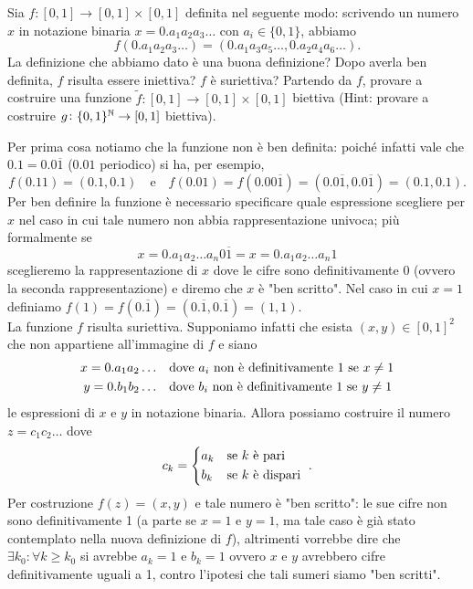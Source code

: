 \documentclass[a4paper]{article}\par \usepackage{style}\par
\begin{document}
\begin{es}
  Sia $ f \colon [0, 1] \to [0, 1] \times [0, 1] $ definita nel seguente modo: scrivendo un numero $ x $ in notazione binaria $ x = 0.a_1 a_2 a_3 \dots $ con $ a_i \in \{0, 1\} $, abbiamo \[f(0.a_1 a_2 a_3 \dots) = (0.a_1 a_3 a_5 \dots, 0.a_2 a_4 a_6 \dots).\] La definizione che abbiamo dato è una buona definizione? Dopo averla ben definita, $ f $ risulta essere iniettiva? $ f $ è suriettiva? Partendo da $ f $, provare a costruire una funzione $ \tilde f \colon [0, 1] \to [0, 1] \times [0, 1] $ biettiva ({Hint}: provare a costruire $ g \colon \{0, 1\}^{\mathbb{N}} \to [0, 1] $ biettiva).
\end{es}\par Per prima cosa notiamo che la funzione non è ben definita: poiché infatti vale che $ 0.1 = 0.0\overline{1} $ ($ 0.01 $ periodico) si ha, per esempio, \[f(0.11) = (0.1, 0.1) \quad \mathrm{e} \quad f(0.01) = f(0.00\overline{1}) = (0.0\overline{1}, 0.0\overline{1}) = (0.1, 0.1).\] Per ben definire la funzione è necessario specificare quale espressione scegliere per $ x $ nel caso in cui tale numero non abbia rappresentazione univoca; più formalmente se \[x = 0.a_1 a_2 \dots a_n 0\overline{1} = x = 0.a_1 a_2 \dots a_n 1\] sceglieremo la rappresentazione di $ x $ dove le cifre sono definitivamente 0 (ovvero la seconda rappresentazione) e diremo che $ x $ è "ben scritto". Nel caso in cui $ x = 1 $ definiamo $ f(1) = f(0.\overline{1}) = (0.\overline{1}, 0.\overline{1}) = (1, 1) $. \\
La funzione $ f $ risulta suriettiva. Supponiamo infatti che esista $ (x, y) \in [0, 1]^2 $ che non appartiene all'immagine di $ f $ e siano
\begin{align*}
  x = 0.a_1 a_2 \dots & \quad \text{dove $ a_i $ non è definitivamente 1 se $ x \neq 1 $} \\
  y = 0.b_1 b_2 \dots & \quad \text{dove $b_i $ non è definitivamente 1 se $ y \neq 1 $}
\end{align*}
le espressioni di $ x $ e $ y $ in notazione binaria. Allora possiamo costruire il numero $ z = c_1 c_2 \dots $ dove
\[c_k =
  \begin{cases*}
    a_k & \text{se $ k $ è pari} \\
    b_k & \text{se $ k $ è dispari}
  \end{cases*}.\]
Per costruzione $ f(z) = (x, y) $ e tale numero è "ben scritto": le sue cifre non sono definitivamente 1 (a parte se $ x = 1 $ e $ y = 1 $, ma tale caso è già stato contemplato nella nuova definizione di $ f $), altrimenti vorrebbe dire che $ \exists k_0 : \forall k \geq k_0 $  si avrebbe $ a_k = 1 $ e $ b_k = 1 $ ovvero $ x $ e $ y $ avrebbero cifre definitivamente uguali a 1,  contro l'ipotesi che tali sumeri siamo "ben scritti". \\
\end{document}
